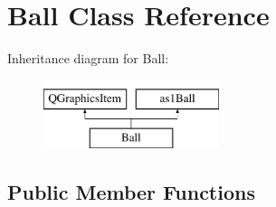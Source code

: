 \hypertarget{class_ball}{\section{Ball Class Reference}
\label{class_ball}
}
Inheritance diagram for Ball\+:\begin{figure}[H]
\begin{center}
\leavevmode
\includegraphics[height=2.000000cm]{class_ball}
\end{center}
\end{figure}
\subsection*{Public Member Functions}
